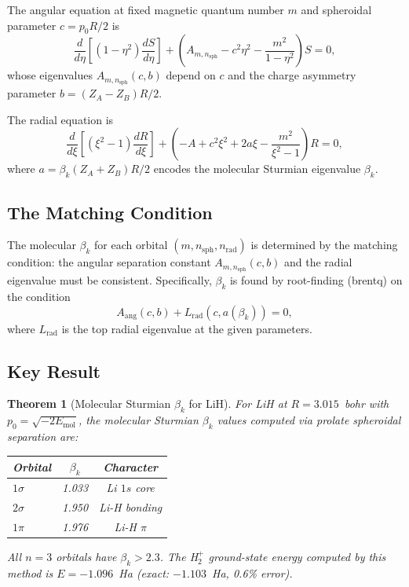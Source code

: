 \documentclass[aps,pra,twocolumn,superscriptaddress,longbibliography]{revtex4-2}
\newtheorem{theorem}{Theorem}
\begin{document}
The angular equation at fixed magnetic quantum number $m$ and spheroidal
parameter $c = p_0 R/2$ is
\begin{equation}
\frac{d}{d\eta}\!\left[(1-\eta^2)\frac{dS}{d\eta}\right]
+ \left(A_{m,n_{\text{sph}}} - c^2\eta^2
- \frac{m^2}{1-\eta^2}\right)S = 0,
\label{eq:angular_eq}
\end{equation}
whose eigenvalues $A_{m,n_{\text{sph}}}(c, b)$ depend on $c$ and the
charge asymmetry parameter $b = (Z_A - Z_B)R/2$.

The radial equation is
\begin{equation}
\frac{d}{d\xi}\!\left[(\xi^2-1)\frac{dR}{d\xi}\right]
+ \left(-A + c^2\xi^2 + 2a\xi
- \frac{m^2}{\xi^2-1}\right)R = 0,
\label{eq:radial_eq}
\end{equation}
where $a = \beta_k(Z_A + Z_B)R/2$ encodes the molecular Sturmian
eigenvalue $\beta_k$.

\subsection{The Matching Condition}

The molecular $\beta_k$ for each orbital $(m, n_{\text{sph}}, n_{\text{rad}})$
is determined by the matching condition: the angular separation constant
$A_{m,n_{\text{sph}}}(c, b)$ and the radial eigenvalue must be
consistent.  Specifically, $\beta_k$ is found by root-finding (brentq)
on the condition
\begin{equation}
A_{\text{ang}}(c, b) + L_{\text{rad}}(c, a(\beta_k)) = 0,
\label{eq:matching}
\end{equation}
where $L_{\text{rad}}$ is the top radial eigenvalue at the given parameters.

\subsection{Key Result}

\begin{theorem}[Molecular Sturmian $\beta_k$ for LiH]
\label{thm:lih_beta}
For LiH at $R = 3.015$~bohr with $p_0 = \sqrt{-2E_{\text{mol}}}$,
the molecular Sturmian $\beta_k$ values computed via prolate spheroidal
separation are:
\begin{center}
\begin{tabular}{lcc}
Orbital & $\beta_k$ & Character \\
\hline
$1\sigma$ & 1.033 & Li $1s$ core \\
$2\sigma$ & 1.950 & Li-H bonding \\
$1\pi$ & 1.976 & Li-H $\pi$ \\
\end{tabular}
\end{center}
All $n = 3$ orbitals have $\beta_k > 2.3$.  The H$_2^+$ ground-state
energy computed by this method is $E = -1.096$~Ha (exact: $-1.103$~Ha,
0.6\% error).
\end{theorem}
\end{document}
